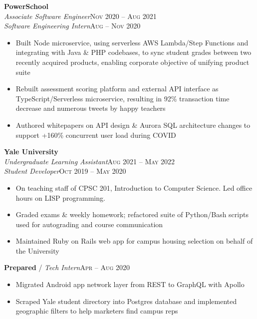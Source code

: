 \documentclass[10pt, a4paper]{article}
\begin{document}
\textbf{PowerSchool}\\
\textit{Associate Software Engineer}\hfill \textsc{Nov 2020 -- Aug 2021}\\
\textit{Software Engineering Intern}\hfill \textsc{Aug -- Nov 2020}\\
\begin{itemize}
    \vspace{-7mm}
    \item Built Node microservice, using serverless AWS Lambda/Step Functions and integrating with Java \& PHP codebases, to sync student grades between two recently acquired products, enabling corporate objective of unifying product suite
    \item Rebuilt assessment scoring platform and external API interface as TypeScript/Serverless microservice, resulting in 92\% transaction time decrease and numerous tweets by happy teachers
    \item Authored whitepapers on API design \& Aurora SQL architecture changes to support +160\% concurrent user load during COVID
\end{itemize}

\textbf{Yale University}\\
\textit{Undergraduate Learning Assistant}\hfill \textsc{Aug 2021 -- May 2022}\\
\textit{Student Developer}\hfill \textsc{Oct 2019 -- May 2020}\\
\begin{itemize}
    \vspace{-7mm}
    \item On teaching staff of CPSC 201, Introduction to Computer Science. Led office hours on LISP programming.
    \item Graded exams \& weekly homework; refactored suite of Python/Bash scripts used for autograding and course communication
    \item Maintained Ruby on Rails web app for campus housing selection on behalf of the University
\end{itemize}

\textbf{Prepared} / \textit{Tech Intern}\hfill \textsc{Apr -- Aug 2020}\\
\begin{itemize}
    \vspace{-7mm}
    \item Migrated Android app network layer from REST to GraphQL with Apollo
    \item Scraped Yale student directory into Postgres database and implemented geographic filters to help marketers find campus reps
\end{itemize}
\end{document}
